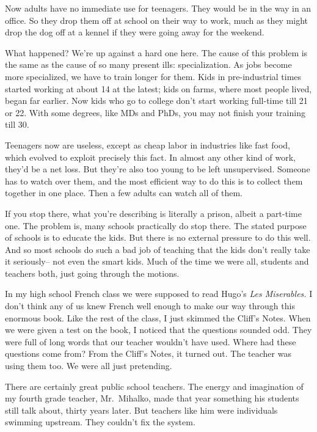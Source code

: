 Now adults have no immediate use for teenagers. They would be in the way
in an office. So they drop them off at school on their way to work, much
as they might drop the dog off at a kennel if they were going away for
the weekend.

What happened? We're up against a hard one here. The cause of this
problem is the same as the cause of so many present ills:
specialization. As jobs become more specialized, we have to train longer
for them. Kids in pre-industrial times started working at about 14 at
the latest; kids on farms, where most people lived, began far earlier.
Now kids who go to college don't start working full-time till 21 or 22.
With some degrees, like MDs and PhDs, you may not finish your training
till 30.

Teenagers now are useless, except as cheap labor in industries like fast
food, which evolved to exploit precisely this fact. In almost any other
kind of work, they'd be a net loss. But they're also too young to be
left unsupervised. Someone has to watch over them, and the most
efficient way to do this is to collect them together in one place. Then
a few adults can watch all of them.

If you stop there, what you're describing is literally a prison, albeit
a part-time one. The problem is, many schools practically do stop there.
The stated purpose of schools is to educate the kids. But there is no
external pressure to do this well. And so most schools do such a bad job
of teaching that the kids don't really take it seriously-- not even the
smart kids. Much of the time we were all, students and teachers both,
just going through the motions.

In my high school French class we were supposed to read Hugo's \emph{Les
Miserables.} I don't think any of us knew French well enough to make our
way through this enormous book. Like the rest of the class, I just
skimmed the Cliff's Notes. When we were given a test on the book, I
noticed that the questions sounded odd. They were full of long words
that our teacher wouldn't have used. Where had these questions come
from? From the Cliff's Notes, it turned out. The teacher was using them
too. We were all just pretending.

There are certainly great public school teachers. The energy and
imagination of my fourth grade teacher, Mr.~Mihalko, made that year
something his students still talk about, thirty years later. But
teachers like him were individuals swimming upstream. They couldn't fix
the system.

